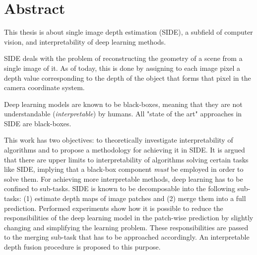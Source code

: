 \chapter*{Abstract}

This thesis is about single image depth estimation (SIDE), a subfield of computer vision, and interpretability of deep learning methods.

SIDE deals with the problem of reconstructing the geometry of a scene from a single image of it.
As of today, this is done by assigning to each image pixel a depth value corresponding to the depth of the object that forms that pixel in the camera coordinate system.

Deep learning models are known to be black-boxes, meaning that they are not understandable (\textit{interpretable}) by humans.
All "state of the art" approaches in SIDE are black-boxes.

This work has two objectives: to theoretically investigate interpretability of algorithms and to propose a methodology for achieving it in SIDE.
It is argued that there are upper limits to interpretability of algorithms solving certain tasks like SIDE, implying that a black-box component \textit{must} be employed in order to solve them.
For achieving more interpretable methods, deep learning has to be confined to sub-tasks.
SIDE is known to be decomposable into the following sub-tasks: (1) estimate depth maps of image patches and (2) merge them into a full prediction.
Performed experiments show how it is possible to reduce the responsibilities of the deep learning model in the patch-wise prediction by slightly changing and simplifying the learning problem.
These responsibilities are passed to the merging sub-task that has to be approached accordingly.
An interpretable depth fusion procedure is proposed to this purpose.

\thispagestyle{empty}
\mbox{}
\newpage
